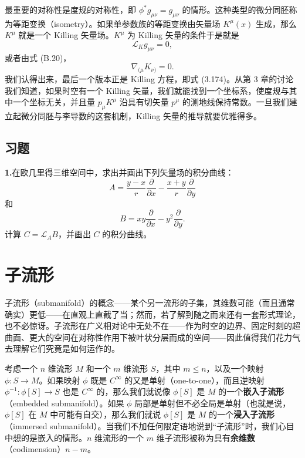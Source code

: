 最重要的对称性是度规的对称性，即 $\phi^* g_{\mu\nu} = g_{\mu\nu}$ 的情形。这种类型的微分同胚称为等距变换（isometry）。如果单参数族的等距变换由矢量场 $K^\mu(x)$ 生成，那么 $K^\mu$ 就是一个 Killing 矢量场。$K^\mu$ 为 Killing 矢量的条件于是就是
\begin{equation*}
\mathcal{L}_K g_{\mu\nu} = 0,
\tag{B.29}
\end{equation*}
或者由式 (B.20)，
\begin{equation*}
\nabla_{(\mu} K_{\nu)} = 0.
\tag{B.30}
\end{equation*}
我们认得出来，最后一个版本正是 Killing 方程，即式 (3.174)。从第 3 章的讨论我们知道，如果时空有一个 Killing 矢量，我们就能找到一个坐标系，使度规与其中一个坐标无关，并且量 $p_\mu K^\mu$ 沿具有切矢量 $p^\mu$ 的测地线保持常数。一旦我们建立起微分同胚与李导数的这套机制，Killing 矢量的推导就要优雅得多。

\section{习题}

\textbf{1.}\quad 在欧几里得三维空间中，求出并画出下列矢量场的积分曲线：
\begin{equation*}
A = \frac{y - x}{r} \frac{\partial}{\partial x} - \frac{x + y}{r} \frac{\partial}{\partial y}
\end{equation*}
和
\begin{equation*}
B = x y \frac{\partial}{\partial x} - y^2 \frac{\partial}{\partial y}.
\end{equation*}
计算 $C = \mathcal{L}_A B$，并画出 $C$ 的积分曲线。



\chapter{子流形}

子流形（submanifold）的概念——某个另一流形的子集，其维数可能（而且通常确实）更低——在直观上直截了当；然而，若了解到随之而来还有一套形式理论，也不必惊讶。子流形在广义相对论中无处不在——作为时空的边界、固定时刻的超曲面、更大的空间在对称性作用下被叶状分层而成的空间——因此值得我们花力气去理解它们究竟是如何运作的。

考虑一个 $n$ 维流形 $M$ 和一个 $m$ 维流形 $S$，其中 $m \leq n$，以及一个映射 $\phi : S \to M$。如果映射 $\phi$ 既是 $C^\infty$ 的又是单射（one-to-one），而且逆映射 $\phi^{-1} : \phi[S] \to S$ 也是 $C^\infty$ 的，那么我们就说像 $\phi[S]$ 是 $M$ 的一个\textbf{嵌入子流形}（embedded submanifold）。如果 $\phi$ 局部是单射但不必全局是单射（也就是说，$\phi[S]$ 在 $M$ 中可能有自交），那么我们就说 $\phi[S]$ 是 $M$ 的一个\textbf{浸入子流形}（immersed submanifold）。当我们不加任何限定语地说到“子流形”时，我们心目中想的是嵌入的情形。$n$ 维流形的一个 $m$ 维子流形被称为具有\textbf{余维数}（codimension）$n - m$。

